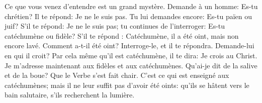 Ce que vous venez d’entendre est un grand mystère.
Demande à un homme: Es-tu chrétien?
	Il te répond: Je ne le suis pas.
Tu lui demandes encore: Es-tu païen ou juif?
	S’il te répond: Je ne le suis pas; tu continues de l’interroger:
	Es-tu catéchumène ou fidèle?
	S’il te répond : Catéchumène, il a été oint, mais non encore lavé.
Comment a-t-il été oint?
	Interroge-le, et il te répondra.
Demande-lui en qui il croit? Par cela même qu’il est catéchumène, il te dira:
	Je crois au Christ.
Je m’adresse maintenant aux fidèles et aux catéchumènes.
Qu’ai-je dit de la salive et de la boue? Que le Verbe s’est fait chair.
C’est ce qui est enseigné aux catéchumènes;
	mais il ne leur suffit pas d’avoir été oints:
	qu’ils se hâtent vers le bain salutaire, s’ils recherchent la lumière.
